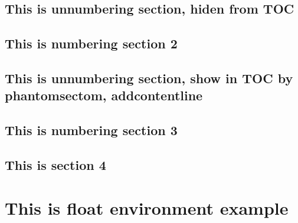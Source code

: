 \documentclass[12pt, a4paper, twoside]{report}
\begin{document}
\section*{This is unnumbering section, hiden from TOC}
\section{This is numbering section 2}

{}
\section*{This is unnumbering section, show in TOC by phantomsectom, addcontentline}

\section{This is numbering section 3}

\section[This is short of section 4]{This is section 4}



\chapter{This is float environment example}

\begin{sideways}
    \parbox{10cm}
    {
        \lipsum[1]\\
        
        \lipsum[2]
    }

    \parbox{10cm}
    {
        \lipsum[2]
    }

\end{sideways}


\newpage

\begin{turn}{45}
    \parbox{10cm}
    {
        \lipsum[1]\\
        
        \lipsum[2]
    }

    \parbox{10cm}
    {
        \lipsum[2]
    }

\end{turn}
\end{document}
